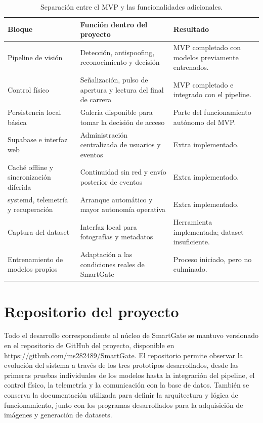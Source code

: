\begin{table}[H]
    \centering
    \small
    \renewcommand{\baselinestretch}{1.15}\selectfont
    \begin{tabular}{|p{4.0cm}|p{4.0cm}|p{6.1cm}|}
        \hline
        \textbf{Bloque} & \textbf{Función dentro del proyecto} & \textbf{Resultado} \\ \hline
        Pipeline de visión & Detección, antispoofing, reconocimiento y decisión & MVP completado con modelos previamente entrenados. \\ \hline
        Control físico & Señalización, pulso de apertura y lectura del final de carrera & MVP completado e integrado con el pipeline. \\ \hline
        Persistencia local básica & Galería disponible para tomar la decisión de acceso & Parte del funcionamiento autónomo del MVP. \\ \hline
        Supabase e interfaz web & Administración centralizada de usuarios y eventos & Extra implementado. \\ \hline
        Caché offline y sincronización diferida & Continuidad sin red y envío posterior de eventos & Extra implementado. \\ \hline
        systemd, telemetría y recuperación & Arranque automático y mayor autonomía operativa & Extra implementado. \\ \hline
        Captura del dataset & Interfaz local para fotografías y metadatos & Herramienta implementada; dataset insuficiente. \\ \hline
        Entrenamiento de modelos propios & Adaptación a las condiciones reales de SmartGate & Proceso iniciado, pero no culminado. \\ \hline
    \end{tabular}
    \caption{Separación entre el MVP y las funcionalidades adicionales.}
    \label{tab:mvp-extras}
\end{table}

\section{Repositorio del proyecto}

Todo el desarrollo correspondiente al núcleo de SmartGate se mantuvo versionado en el repositorio de GitHub del proyecto, disponible en \url{https://github.com/ms282489/SmartGate}. El repositorio permite observar la evolución del sistema a través de los tres prototipos desarrollados, desde las primeras pruebas individuales de los modelos hasta la integración del pipeline, el control físico, la telemetría y la comunicación con la base de datos. También se conserva la documentación utilizada para definir la arquitectura y lógica de funcionamiento, junto con los programas desarrollados para la adquisición de imágenes y generación de datasets.

